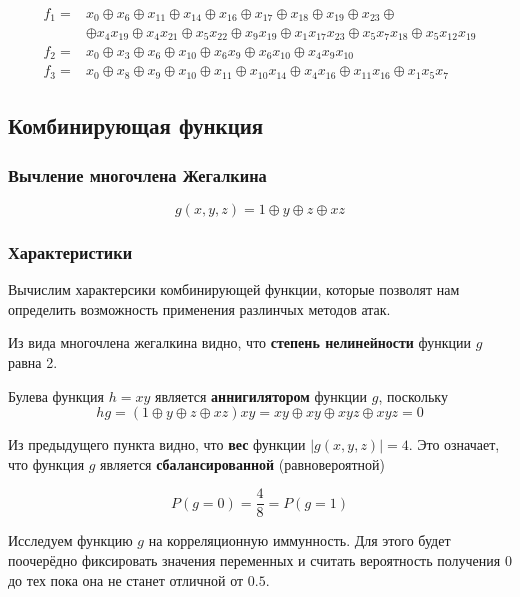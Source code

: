 \documentclass[a4paper,12pt]{article}
\theoremstyle{definition}
\begin{document}
	\begin{align*}
		f_1 =& x_0 \oplus x_6 \oplus x_{11} \oplus x_{14} \oplus x_{16} \oplus x_{17} \oplus x_{18} \oplus x_{19} \oplus x_{23} \oplus\\
			 &\oplus x_{4} x_{19} \oplus x_{4} x_{21} \oplus x_5 x_{22} \oplus x_9 x_{19} \oplus x_1 x_{17} x_23 \oplus x_5 x_7 x_{18} \oplus x_5 x_{12} x_{19} \\[2ex]
		f_2 =& x_0 \oplus x_3 \oplus x_6 \oplus x_{10} \oplus x_6 x_9 \oplus x_6 x_{10} \oplus x_4 x_9 x_{10} \\[2ex]
		f_3 =& x_0 \oplus x_8 \oplus x_9 \oplus x_{10} \oplus x_{11} \oplus x_{10} x_{14} \oplus x_4 x_{16}\oplus x_{11} x_{16} \oplus x_1 x_5 x_7 
	\end{align*}
	
	\subsection{Комбинирующая функция}
	
	\subsubsection{Вычление многочлена Жегалкина}
		
	\[ g(x,y,z) = 1 \oplus y \oplus z \oplus x z\]

	\subsubsection{Характеристики} \label{Характеристики}
	
	Вычислим характерсики комбинирующей функции, которые позволят нам определить возможность применения разлинчых методов атак.
	
	Из вида многочлена жегалкина видно, что \textbf{степень нелинейности} функции $g$ равна 2. 
	
	Булева функция $h = x y$ является \textbf{аннигилятором} функции $g$, поскольку
	\[ h g = \left(1 \oplus y \oplus z \oplus x z \right) xy = xy \oplus xy \oplus xyz \oplus xyz = 0 \]

	Из предыдущего пункта видно, что \textbf{вес} функции $|g(x,y,z)| = 4$. Это означает, что функция $g$ является \textbf{сбалансированной} (равновероятной)
	
	\[ P(g = 0) = \frac{4}{8} = P(g = 1) \]

	Исследуем функцию $g$ на корреляционную иммунность. Для этого будет поочерёдно фиксировать значения переменных и считать вероятность получения $0$ до тех пока она не станет отличной от $0.5$.
	
\end{document}
